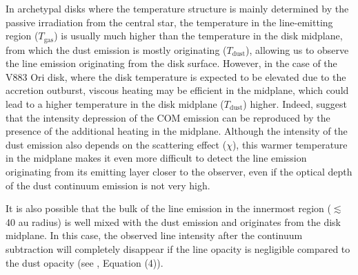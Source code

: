 \documentclass[linenumbers, twocolumn, twocolappendix, astrosymb, times]{aastex631}
\begin{document}
In archetypal disks where the temperature structure is mainly determined by the passive irradiation from the central star, the temperature in the line-emitting region ($T_\mathrm{gas}$) is usually much higher than the temperature in the disk midplane, from which the dust emission is mostly originating ($T_\mathrm{dust}$), allowing us to observe the line emission originating from the disk surface. However, in the case of the V883 Ori disk, where the disk temperature is expected to be elevated due to the accretion outburst, viscous heating may be efficient in the midplane, which could lead to a higher temperature in the disk midplane ($T_\mathrm{dust}$) higher. Indeed, \citet{Lee2019} suggest that the intensity depression of the COM emission can be reproduced by the presence of the additional heating in the midplane. Although the intensity of the dust emission also depends on the scattering effect ($\chi$), this warmer temperature in the midplane makes it even more difficult to detect the line emission originating from its emitting layer closer to the observer, even if the optical depth of the dust continuum emission is not very high. 

It is also possible that the bulk of the line emission in the innermost region ($\lesssim$ 40 au radius) is well mixed with the dust emission and originates from the disk midplane. In this case, the observed line intensity after the continuum subtraction will completely disappear if the line opacity is negligible compared to the dust opacity (see \citealt{Bosman2021}, Equation (4)). 


\end{document}
